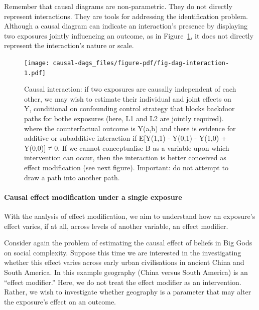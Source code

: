 \documentclass[
  singlecolumn]{article}
\let\oldparagraph\paragraph
\renewcommand{\paragraph}[1]{\oldparagraph{#1}\mbox{}}
\begin{document}
Remember that causal diagrams are non-parametric. They do not directly
represent interactions. They are tools for addressing the identification
problem. Although a causal diagram can indicate an interaction's
presence by displaying two exposures jointly influencing an outcome, as
in Figure~\ref{fig-dag-interaction}, it does not directly represent the
interaction's nature or scale.

\begin{figure}

{\centering \texttt{[image: causal-dags\_files/figure-pdf/fig-dag-interaction-1.pdf]}

}

\caption{\label{fig-dag-interaction}Causal interaction: if two exposures
are causally independent of each other, we may wish to estimate their
individual and joint effects on Y, conditional on confounding control
strategy that blocks backdoor paths for bothe exposures (here, L1 and L2
are jointly required). where the counterfactual outcome is Y(a,b) and
there is evidence for additive or subadditive interaction if E{[}Y(1,1)
- Y(0,1) - Y(1,0) + Y(0,0){]} ≠ 0. If we cannot conceptualise B as a
variable upon which intervention can occur, then the interaction is
better conceived as effect modification (see next figure). Important: do
not attempt to draw a path into another path.}

\end{figure}

\hypertarget{causal-effect-modification-under-a-single-exposure}{%
\paragraph{\texorpdfstring{\textbf{Causal effect modification under a
single
exposure}}{Causal effect modification under a single exposure}}\label{causal-effect-modification-under-a-single-exposure}}

With the analysis of effect modification, we aim to understand how an
exposure's effect varies, if at all, across levels of another variable,
an effect modifier.

Consider again the problem of estimating the causal effect of beliefs in
Big Gods on social complexity. Suppose this time we are interested in
the investigating whether this effect varies across early urban
civilisations in ancient China and South America. In this example
geography (China versus South America) is an ``effect modifier.'' Here,
we do not treat the effect modifier as an intervention. Rather, we wish
to investigate whether geography is a parameter that may alter the
exposure's effect on an outcome.
\end{document}
